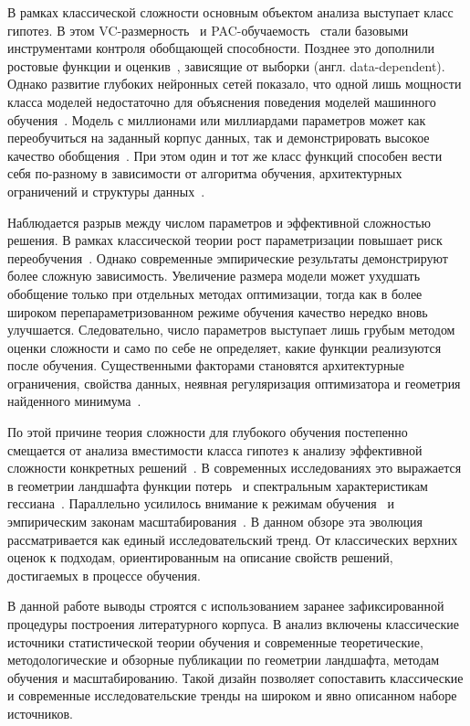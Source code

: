 В рамках классической сложности основным объектом анализа выступает класс гипотез.
В этом VC-размерность~\cite{vapnik1971uniform} и PAC-обучаемость~\cite{valiant1984theory} стали базовыми инструментами контроля обобщающей способности. Позднее это дополнили ростовые функции и оценкив~\cite{vapnik1998statistical,bartlett2002rademacher}, зависящие от выборки (англ. data-dependent).
Однако развитие глубоких нейронных сетей показало, что одной лишь мощности класса моделей недостаточно для объяснения поведения моделей машинного обучения~\cite{zhang2021rethinking}.
Модель с миллионами или миллиардами параметров может как переобучиться на заданный корпус данных, так и демонстрировать высокое качество обобщения~\cite{belkin2019reconciling}.
При этом один и тот же класс функций способен вести себя по-разному в зависимости от алгоритма обучения, архитектурных ограничений и структуры данных~\cite{zhang2021rethinking,belkin2019reconciling}.

Наблюдается разрыв между числом параметров и эффективной сложностью решения.
В рамках классической теории рост параметризации повышает риск переобучения~\cite{valiant1984theory}.
Однако современные эмпирические результаты демонстрируют более сложную зависимость.
Увеличение размера модели может ухудшать обобщение только при отдельных методах оптимизации, тогда как в более широком перепараметризованном режиме обучения качество нередко вновь улучшается.
Следовательно, число параметров выступает лишь грубым методом оценки сложности и само по себе не определяет, какие функции реализуются после обучения.
Существенными факторами становятся архитектурные ограничения, свойства данных, неявная регуляризация оптимизатора и геометрия найденного минимума~\cite{li2018visualizing}.

По этой причине теория сложности для глубокого обучения постепенно смещается от анализа вместимости класса гипотез к анализу эффективной сложности конкретных решений~\cite{hochreiter1997flat}.
В современных исследованиях это выражается в геометрии ландшафта функции потерь~\cite{li2018visualizing} и спектральным характеристикам гессиана~\cite{sagun2017eigenvalues}. Параллельно усилилось внимание к режимам обучения~\cite{nakkiran2021doubledescent} и эмпирическим законам масштабирования~\cite{hochreiter1997flat,kaplan2020scaling}.
В данном обзоре эта эволюция рассматривается как единый исследовательский тренд.
От классических верхних оценок к подходам, ориентированным на описание свойств решений, достигаемых в процессе обучения.

В данной работе выводы строятся с использованием заранее зафиксированной процедуры построения литературного корпуса.
В анализ включены классические источники статистической теории обучения и современные теоретические, методологические и обзорные публикации по геометрии ландшафта, методам обучения и масштабированию.
Такой дизайн позволяет сопоставить классические и современные исследовательские тренды на широком и явно описанном наборе источников.


